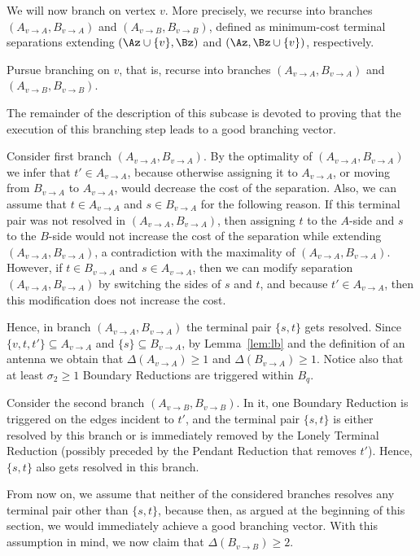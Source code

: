 We will now branch on vertex $v$. More precisely, we recurse into branches $(A_{v\to A},B_{v\to A})$ and $(A_{v\to B},B_{v\to B})$, defined as minimum-cost terminal separations extending $(\Az\cup \{v\},\Bz)$ and $(\Az,\Bz\cup \{v\})$, respectively.

\begin{branching}
Pursue branching on $v$, that is, recurse into branches $(A_{v\to A},B_{v\to A})$ and $(A_{v\to B},B_{v\to B})$.
\end{branching}

The remainder of the description of this subcase is devoted to proving that the execution of this branching step leads to a good branching vector.

Consider first branch $(A_{v\to A},B_{v\to A})$. By the optimality of $(A_{v\to A},B_{v\to A})$ we infer that $t'\in A_{v\to A}$, because otherwise assigning it to $A_{v\to A}$, or moving from $B_{v\to A}$ to $A_{v\to A}$, would decrease the cost of the separation. Also, we can assume that $t\in A_{v\to A}$ and $s\in B_{v\to A}$ for the following reason. If this terminal pair was not resolved in $(A_{v\to A},B_{v\to A})$, then assigning $t$ to the $A$-side and $s$ to the $B$-side would not increase the cost of the separation while extending $(A_{v\to A},B_{v\to A})$, a contradiction with the maximality of $(A_{v\to A},B_{v\to A})$. However, if $t\in B_{v\to A}$ and $s\in A_{v\to A}$, then we can modify separation $(A_{v\to A},B_{v\to A})$ by switching the sides of $s$ and $t$, and because $t'\in A_{v\to A}$, then this modification does not increase the cost. 

Hence, in branch $(A_{v\to A},B_{v\to A})$ the terminal pair $\{s,t\}$ gets resolved. Since $\{v,t,t'\}\subseteq A_{v\to A}$ and $\{s\}\subseteq B_{v\to A}$, by Lemma~\ref{lem:lb} and the definition of an antenna we obtain that $\Delta(A_{v\to A})\geq 1$ and $\Delta(B_{v\to A})\geq 1$. Notice also that at least $\sigma_2\geq 1$ Boundary Reductions are triggered within $B_q$.

Consider the second branch $(A_{v\to B},B_{v\to B})$. In it, one Boundary Reduction is triggered on the edges incident to $t'$, and the terminal pair $\{s,t\}$ is either resolved by this branch or is immediately removed by the Lonely Terminal Reduction (possibly preceded by the Pendant Reduction that removes $t'$). Hence, $\{s,t\}$ also gets resolved in this branch.

From now on, we assume that neither of the considered branches resolves any terminal pair other than $\{s,t\}$, because then, as argued at the beginning of this section, we would immediately achieve a good branching vector. With this assumption in mind, we now claim that $\Delta(B_{v\to B})\geq 2$. 

